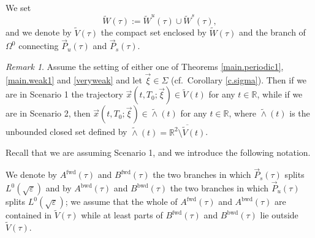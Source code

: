 \documentclass[10pt]{article}
\numberwithin{equation}{section}
\def\ep{\varepsilon}
\def\Om{\Omega}
\def\R{{\mathbb R}}
\def\P{\vec{P}}
\def\xxi{\vec{\xi}}
\def\x{\vec{x}}
\theoremstyle{definition}
\theoremstyle{remark}
\newtheorem{remark}[theorem]{Remark}
\begin{document}
We set
\begin{equation}\label{tildeW}
\tilde{W}(\tau):= \tilde{W}^u(\tau) \cup \tilde{W}^s(\tau),
\end{equation}
and we denote by $\tilde{V}(\tau)$ the compact set enclosed by $\tilde{W}(\tau)$ and the
branch of $\Om^0$ connecting $\P_u(\tau)$ and $\P_s(\tau)$.









 \begin{remark}\label{Rscenarios12}
  Assume  the setting of either one of Theorems \ref{main.periodic1},  \ref{main.weak1} and \ref{veryweak} and let $\xxi \in \Sigma$ (cf.~Corollary \ref{c.sigma}).
  Then if we are in Scenario 1 the trajectory $\x(t,T_0; \xxi) \in \tilde{V}(t)$ for any $t \in \R$, while if we are in Scenario 2,
  then
  $\x(t,T_0; \xxi) \in \tilde{\wedge}(t)$ for any $t \in \R$, where $\tilde{\wedge}(t)$ is the unbounded closed set defined by $\tilde{\wedge}(t)=\overline{\R^2\setminus \tilde{V}(t)}$.
\end{remark}


Recall that we are assuming Scenario 1,
and we introduce the following notation.

We denote by $A^{\textrm{fwd}}(\tau)$ and   $B^{\textrm{fwd} }(\tau)$
the two branches in which $\vec{P}_s(\tau)$ splits $L^0(\sqrt{\ep})$ and by
$A^{\textrm{bwd}}(\tau)$ and  $B^{\textrm{bwd} }(\tau)$
 the two branches in which $\vec{P}_u(\tau)$ splits $L^0(\sqrt{\ep})$; we assume that  the whole of  $A^{\textrm{fwd}}(\tau)$
 and $A^{\textrm{bwd}}(\tau)$ are contained in $\tilde{V}(\tau)$ while at least parts of  $B^{\textrm{fwd}}(\tau)$
 and $B^{\textrm{bwd}}(\tau)$ lie outside $\tilde{V}(\tau)$.
\end{document}
